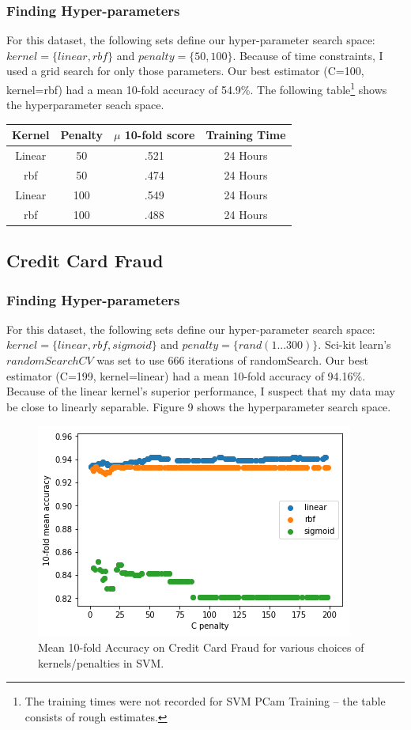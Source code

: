 \documentclass[a4paper]{article}
\begin{document}
\subsubsection{Finding Hyper-parameters}
For this dataset, the following sets define our hyper-parameter search space:  $kernel = \{linear, rbf\}$ and $penalty = \{50, 100\}$. Because of time constraints, I used a grid search for only those parameters. Our best estimator (C=100, kernel=rbf) had a mean 10-fold accuracy of 54.9\%. The following table\footnote{The training times were not recorded for SVM PCam Training -- the table consists of rough estimates.} shows the hyperparameter seach space. 
\begin{center}
\begin{tabular}{ |c|c|c|c| } 
\hline
Kernel & Penalty & \begin{math}\mu\end{math} 10-fold score & Training Time\\
\hline
Linear & 50 & .521 & 24 Hours\\ 
rbf & 50 & .474 & 24 Hours\\ 
Linear & 100 & .549 & 24 Hours\\ 
rbf & 100 & .488 & 24 Hours\\ 
\hline
\end{tabular}
\end{center}

\subsection{Credit Card Fraud}
\subsubsection{Finding Hyper-parameters}
For this dataset, the following sets define our hyper-parameter search space:  $kernel = \{linear, rbf, sigmoid\}$ and $penalty = \{rand(1...300)\}$. Sci-kit learn's $randomSearchCV$ was set to use 666 iterations of randomSearch. Our best estimator (C=199, kernel=linear) had a mean 10-fold accuracy of 94.16\%. Because of the linear kernel's superior performance, I suspect that my data may be close to linearly separable. Figure 9 shows the hyperparameter search space.
\begin{figure}
  \centering
  \includegraphics[width=.6\textwidth]{images/svm.png}
  \caption{Mean 10-fold Accuracy on Credit Card Fraud for various choices of kernels/penalties in SVM.}
\end{figure}
\end{document}
